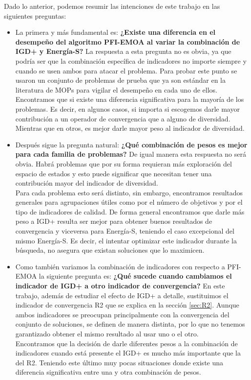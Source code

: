 Dado lo anterior, podemos resumir las intenciones de este trabajo en las siguientes preguntas:

\begin{itemize}
    \item La primera y más fundamental es: \textbf{¿Existe una diferencia en el desempeño del algoritmo PFI-EMOA al variar la combinación de IGD+ y Energía-S?}
    La respuesta a esta pregunta no es obvia, ya que podría ser que la combinación específica de indicadores no importe siempre y cuando se usen ambos para atacar el problema. Para probar este punto se usaron un conjunto de problemas de prueba que ya son estándar en la literatura de MOPs para vigilar el desempeño en cada uno de ellos. 
    \\Encontramos que si existe una diferencia significativa para la mayoría de los problemas. Es decir, en algunos casos, si importa si escogemos darle mayor contribución a un operador de convergencia que a alguno de diversidad. Mientras que en otros, es mejor darle mayor peso al indicador de diversidad.
    \item Después sigue la pregunta natural: \textbf{¿Qué combinación de pesos es mejor para cada familia de problemas?}
    De igual manera esta respuesta no será obvia. Habrá problemas que por su forma requieran más exploración del espacio de estados y esto puede significar que necesitan tener una contribución mayor del indicador de diversidad. \\
    Para cada problema esto será distinto, sin embargo, encontramos resultados generales para agrupaciones útiles como por el número de objetivos y por el tipo de indicadores de calidad. De forma general encontramos que darle más peso a IGD+ resulta ser mejor para obtener buenos resultados de convergencia y viceversa para Energía-S, teniendo el caso excepcional del mismo Energía-S. Es decir, el intentar optimizar este indicador durante la búsqueda, no asegura que existan soluciones que lo maximicen.
    \item Como también variamos la combinación de indicadores con respecto a PFI-EMOA la siguiente pregunta es: \textbf{¿Qué sucede cuando cambiamos el indicador de IGD+ a otro indicador de convergencia?}
    En este trabajo, además de estudiar el efecto de IGD+ a detalle, sustituimos el indicador de convergencia R2 \cite{R2} que se explica en la sección \ref{sec:R2}. Aunque ambos indicadores se preocupan principalmente con la convergencia del conjunto de soluciones, se definen de manera distinta, por lo que no tenemos garantizado obtener el mismo resultado al usar uno o el otro.\\
    Encontramos que la decisión de darle diferentes pesos a la combinación de indicadores cuando está presente el IGD+ es mucho más importante que la del R2. Teniendo este último muy pocas situaciones donde existe una diferencia significativa entre una y otra combinación de pesos.
   
\end{itemize}


